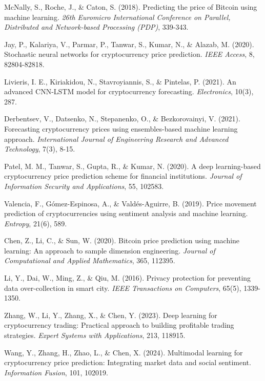 \documentclass[11pt,a4paper]{article}
\begin{document}
\begin{thebibliography}{99}
McNally, S., Roche, J., \& Caton, S. (2018).
Predicting the price of Bitcoin using machine learning.
\textit{26th Euromicro International Conference on Parallel, Distributed and Network-based Processing (PDP)}, 339-343.

Jay, P., Kalariya, V., Parmar, P., Tanwar, S., Kumar, N., \& Alazab, M. (2020).
Stochastic neural networks for cryptocurrency price prediction.
\textit{IEEE Access}, 8, 82804-82818.

Livieris, I. E., Kiriakidou, N., Stavroyiannis, S., \& Pintelas, P. (2021).
An advanced CNN-LSTM model for cryptocurrency forecasting.
\textit{Electronics}, 10(3), 287.

Derbentsev, V., Datsenko, N., Stepanenko, O., \& Bezkorovainyi, V. (2021).
Forecasting cryptocurrency prices using ensembles-based machine learning approach.
\textit{International Journal of Engineering Research and Advanced Technology}, 7(3), 8-15.

Patel, M. M., Tanwar, S., Gupta, R., \& Kumar, N. (2020).
A deep learning-based cryptocurrency price prediction scheme for financial institutions.
\textit{Journal of Information Security and Applications}, 55, 102583.

Valencia, F., Gómez-Espinosa, A., \& Valdés-Aguirre, B. (2019).
Price movement prediction of cryptocurrencies using sentiment analysis and machine learning.
\textit{Entropy}, 21(6), 589.

Chen, Z., Li, C., \& Sun, W. (2020).
Bitcoin price prediction using machine learning: An approach to sample dimension engineering.
\textit{Journal of Computational and Applied Mathematics}, 365, 112395.

Li, Y., Dai, W., Ming, Z., \& Qiu, M. (2016).
Privacy protection for preventing data over-collection in smart city.
\textit{IEEE Transactions on Computers}, 65(5), 1339-1350.

Zhang, W., Li, Y., Zhang, X., \& Chen, Y. (2023).
Deep learning for cryptocurrency trading: Practical approach to building profitable trading strategies.
\textit{Expert Systems with Applications}, 213, 118915.

Wang, Y., Zhang, H., Zhao, L., \& Chen, X. (2024).
Multimodal learning for cryptocurrency price prediction: Integrating market data and social sentiment.
\textit{Information Fusion}, 101, 102019.


\end{thebibliography}
\end{document}
